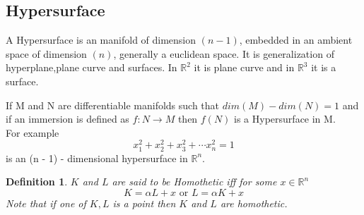 \documentclass[oneside]{book}
\newtheorem{mydef}{Definition}[section]
\begin{document}
	
	
	
	
	
	
	
	
	
	
	
	
	
	
	
	
	
	
	
	
	
	
	
	
	
	
	
	
	
	
	
	
	
	
	
	
	\subsection{Hypersurface}
	\label{ss:10}
	A Hypersurface is an manifold of dimension $(n - 1)$, embedded in an ambient space of dimension $( n)$, generally a euclidean space. It is generalization of hyperplane,plane curve and surfaces. In $\mathbb{R}^2$ it is plane curve and in $\mathbb{R}^3$ it is a surface.
	
	
	If M and N are differentiable manifolds such that $dim(M)-dim(N) = 1 $ and if an immersion is defined as $f: N\rightarrow M$ then $f(N)$ is a Hypersurface in M.
	\\
	For example 
	\begin{equation*}
		x_{1}^2 + x_{2}^2+x_{3}^2+ \cdots x_{n}^2 = 1 
	\end{equation*}
	is an (n - 1) - dimensional hypersurface in $\mathbb{R}^n$.    
	
	
	\begin{mydef} \label{d:2}
		$K$ and $L$ are said to be Homothetic iff for some $x  \in \mathbb{R}^n$ \\
		$$K = \alpha L + x \text{ or } L=\alpha K+x $$
		Note that if one of $K, L $ is a point then $K $ and $L$ are homothetic.
	\end{mydef}
	
\end{document}
